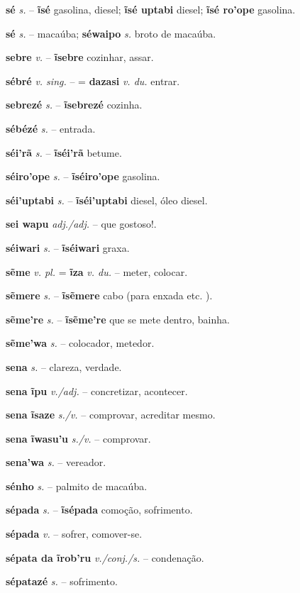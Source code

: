 \textbf{sé} \textit{s.} -- \textbf{ĩsé} gasolina, diesel; \textbf{ĩsé uptabi} diesel; \textbf{ĩsé ro'ope} gasolina.

\textbf{sé} \textit{s.} -- macaúba; \textbf{séwaipo} \textit{s.} broto de macaúba.

\textbf{sebre} \textit{v.} -- \textbf{ĩsebre} cozinhar, assar.

\textbf{sébré} \textit{v. sing.} -- = \textbf{dazasi} \textit{v. du.} entrar.

\textbf{sebrezé} \textit{s.} -- \textbf{ĩsebrezé} cozinha.

\textbf{sébézé} \textit{s.} -- entrada.

\textbf{séi'rã} \textit{s.} -- \textbf{ĩséi'rã} betume.

\textbf{séiro'ope} \textit{s.} -- \textbf{ĩséiro'ope} gasolina.

\textbf{séi'uptabi} \textit{s.} -- \textbf{ĩséi'uptabi} diesel, óleo diesel.

\textbf{sei wapu} \textit{adj./adj.} -- que gostoso!.

\textbf{séiwari} \textit{s.} -- \textbf{ĩséiwari} graxa.

\textbf{sẽme} \textit{v. pl.} = \textbf{ĩza} \textit{v. du.} -- meter, colocar.

\textbf{sẽmere} \textit{s.} -- \textbf{ĩsẽmere} cabo (para enxada etc. ).

\textbf{sẽme're} \textit{s.} -- \textbf{ĩsẽme're} que se mete dentro, bainha.

\textbf{sẽme'wa} \textit{s.} -- colocador, metedor.

\textbf{sena} \textit{s.} -- clareza, verdade.

\textbf{sena ĩpu} \textit{v./adj.} -- concretizar, acontecer.

\textbf{sena ĩsaze} \textit{s./v.} -- comprovar, acreditar mesmo.

\textbf{sena ĩwasu'u} \textit{s./v.} -- comprovar.

\textbf{sena'wa} \textit{s.} -- vereador.

\textbf{sénho} \textit{s.} -- palmito de macaúba.

\textbf{sépada} \textit{s.} -- \textbf{ĩsépada} comoção, sofrimento.

\textbf{sépada} \textit{v.} -- sofrer, comover-se.

\textbf{sépata da ĩrob'ru} \textit{v./conj./s.} -- condenação.

\textbf{sépatazé} \textit{s.} -- sofrimento.

